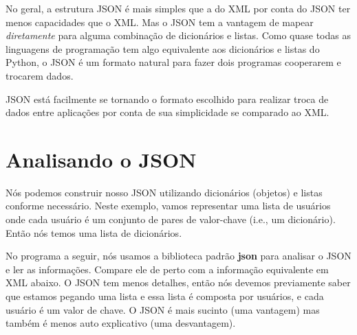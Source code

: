 No geral, a estrutura JSON é mais simples que a do XML por conta do JSON ter menos
capacidades que o XML. Mas o JSON tem a vantagem de mapear {\em diretamente} para alguma
combinação de dicionários e listas. Como quase todas as linguagens de programação 
tem algo equivalente aos dicionários e listas do Python, o JSON é um formato natural 
para fazer dois programas cooperarem e trocarem dados.

JSON está facilmente se tornando o formato escolhido para realizar troca de dados
entre aplicações por conta de sua simplicidade se comparado ao XML.

\section{Analisando o JSON}

Nós podemos construir nosso JSON utilizando dicionários (objetos) e listas conforme
necessário. Neste exemplo, vamos representar uma lista de usuários onde cada
usuário é um conjunto de pares de valor-chave (i.e., um dicionário). Então nós temos
uma lista de dicionários.

No programa a seguir, nós usamos a biblioteca padrão {\bf json} para analisar
o JSON e ler as informações. Compare ele de perto com a informação equivalente em XML
abaixo. O JSON tem menos detalhes, então nós devemos previamente saber que
estamos pegando uma lista e essa lista é composta por usuários, e cada usuário é um valor de 
chave. O JSON é mais sucinto (uma vantagem) mas também é menos auto explicativo 
(uma desvantagem).

